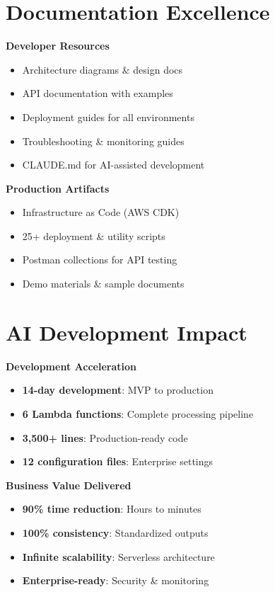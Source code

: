 \documentclass[11pt,letterpaper]{article}
\begin{document}
\begin{multicols}{2}
\section*{Documentation Excellence}

\textbf{Developer Resources}
\begin{itemize}[itemsep=1pt]
\item Architecture diagrams \& design docs
\item API documentation with examples
\item Deployment guides for all environments
\item Troubleshooting \& monitoring guides
\item CLAUDE.md for AI-assisted development
\end{itemize}

\textbf{Production Artifacts}
\begin{itemize}[itemsep=1pt]
\item Infrastructure as Code (AWS CDK)
\item 25+ deployment \& utility scripts
\item Postman collections for API testing
\item Demo materials \& sample documents
\end{itemize}

\section*{AI Development Impact}

\textbf{Development Acceleration}
\begin{itemize}[itemsep=1pt]
\item \textbf{14-day development}: MVP to production
\item \textbf{6 Lambda functions}: Complete processing pipeline
\item \textbf{3,500+ lines}: Production-ready code
\item \textbf{12 configuration files}: Enterprise settings
\end{itemize}

\textbf{Business Value Delivered}
\begin{itemize}[itemsep=1pt]
\item \textbf{90\% time reduction}: Hours to minutes
\item \textbf{100\% consistency}: Standardized outputs
\item \textbf{Infinite scalability}: Serverless architecture
\item \textbf{Enterprise-ready}: Security \& monitoring
\end{itemize}

\end{multicols}
\end{document}
